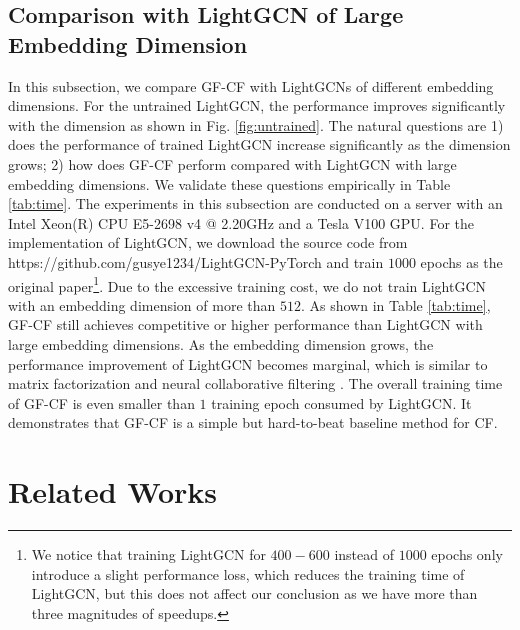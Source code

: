 \documentclass[sigconf]{acmart}
\begin{document}
\subsection{Comparison with LightGCN of Large Embedding Dimension} \label{sec:time}
In this subsection, we compare GF-CF with LightGCNs of different embedding dimensions. For the untrained LightGCN, the performance improves significantly with the dimension as shown in Fig. \ref{fig:untrained}. The natural questions are 1) does the performance of trained LightGCN increase significantly as the dimension grows; 2) how does GF-CF perform compared with LightGCN with large embedding dimensions. We validate these questions empirically in Table \ref{tab:time}. The experiments in this subsection are conducted on a server with an Intel Xeon(R) CPU E5-2698 v4 @ 2.20GHz and a Tesla V100 GPU. For the implementation of LightGCN, we download the source code from https://github.com/gusye1234/LightGCN-PyTorch and train $1000$ epochs as the original paper\footnote{We notice that training LightGCN for $400-600$ instead of $1000$ epochs only introduce a slight performance loss, which reduces the training time of LightGCN, but this does not affect our conclusion as we have more than three magnitudes of speedups.}. Due to the excessive training cost, we do not train LightGCN with an embedding dimension of more than $512$. As shown in Table \ref{tab:time}, GF-CF still achieves competitive or higher performance than LightGCN with large embedding dimensions. As the embedding dimension grows, the performance improvement of LightGCN becomes marginal, which is similar to matrix factorization and neural collaborative filtering \cite{rendle2020neural}. The overall training time of GF-CF is even smaller than $1$ training epoch consumed by LightGCN. It demonstrates that GF-CF is a simple but hard-to-beat baseline method for CF.





\section{Related Works}
\label{sec:literature}
\end{document}
